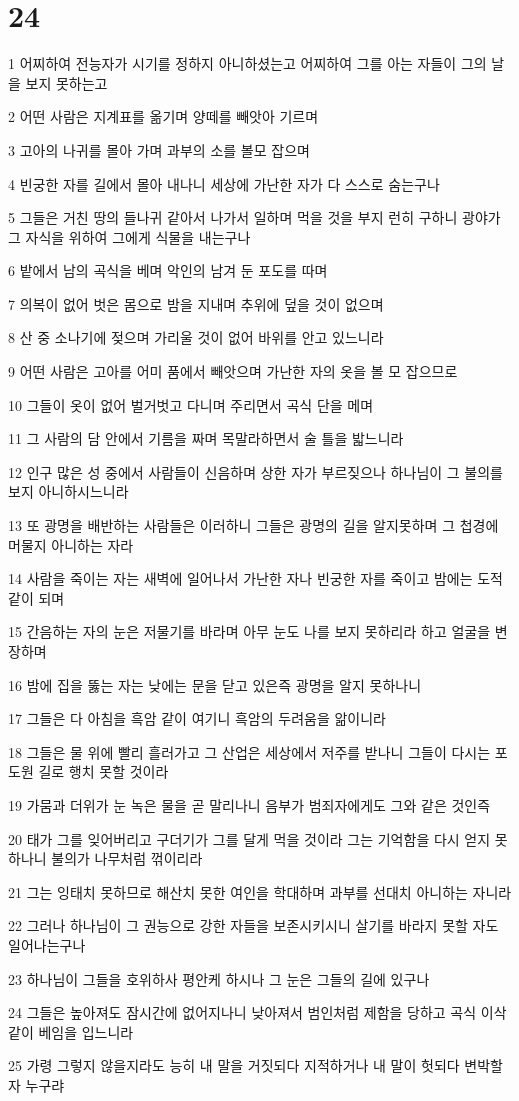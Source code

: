 \chapter{24}

\par 1 어찌하여 전능자가 시기를 정하지 아니하셨는고 어찌하여 그를 아는 자들이 그의 날을 보지 못하는고
\par 2 어떤 사람은 지계표를 옮기며 양떼를 빼앗아 기르며
\par 3 고아의 나귀를 몰아 가며 과부의 소를 볼모 잡으며
\par 4 빈궁한 자를 길에서 몰아 내나니 세상에 가난한 자가 다 스스로 숨는구나
\par 5 그들은 거친 땅의 들나귀 같아서 나가서 일하며 먹을 것을 부지 런히 구하니 광야가 그 자식을 위하여 그에게 식물을 내는구나
\par 6 밭에서 남의 곡식을 베며 악인의 남겨 둔 포도를 따며
\par 7 의복이 없어 벗은 몸으로 밤을 지내며 추위에 덮을 것이 없으며
\par 8 산 중 소나기에 젖으며 가리울 것이 없어 바위를 안고 있느니라
\par 9 어떤 사람은 고아를 어미 품에서 빼앗으며 가난한 자의 옷을 볼 모 잡으므로
\par 10 그들이 옷이 없어 벌거벗고 다니며 주리면서 곡식 단을 메며
\par 11 그 사람의 담 안에서 기름을 짜며 목말라하면서 술 틀을 밟느니라
\par 12 인구 많은 성 중에서 사람들이 신음하며 상한 자가 부르짖으나 하나님이 그 불의를 보지 아니하시느니라
\par 13 또 광명을 배반하는 사람들은 이러하니 그들은 광명의 길을 알지못하며 그 첩경에 머물지 아니하는 자라
\par 14 사람을 죽이는 자는 새벽에 일어나서 가난한 자나 빈궁한 자를 죽이고 밤에는 도적 같이 되며
\par 15 간음하는 자의 눈은 저물기를 바라며 아무 눈도 나를 보지 못하리라 하고 얼굴을 변장하며
\par 16 밤에 집을 뚫는 자는 낮에는 문을 닫고 있은즉 광명을 알지 못하나니
\par 17 그들은 다 아침을 흑암 같이 여기니 흑암의 두려움을 앎이니라
\par 18 그들은 물 위에 빨리 흘러가고 그 산업은 세상에서 저주를 받나니 그들이 다시는 포도원 길로 행치 못할 것이라
\par 19 가뭄과 더위가 눈 녹은 물을 곧 말리나니 음부가 범죄자에게도 그와 같은 것인즉
\par 20 태가 그를 잊어버리고 구더기가 그를 달게 먹을 것이라 그는 기억함을 다시 얻지 못하나니 불의가 나무처럼 꺾이리라
\par 21 그는 잉태치 못하므로 해산치 못한 여인을 학대하며 과부를 선대치 아니하는 자니라
\par 22 그러나 하나님이 그 권능으로 강한 자들을 보존시키시니 살기를 바라지 못할 자도 일어나는구나
\par 23 하나님이 그들을 호위하사 평안케 하시나 그 눈은 그들의 길에 있구나
\par 24 그들은 높아져도 잠시간에 없어지나니 낮아져서 범인처럼 제함을 당하고 곡식 이삭 같이 베임을 입느니라
\par 25 가령 그렇지 않을지라도 능히 내 말을 거짓되다 지적하거나 내 말이 헛되다 변박할 자 누구랴

